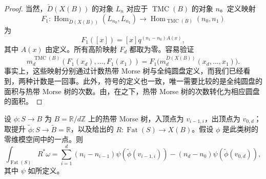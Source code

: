 \begin{proof}
当然，$\check D(X(B))$ 的对象 $L_n$ 对应于 $\operatorname{TMC}(B)$ 的对象 $n$。定义映射
\[
F_1\colon\operatorname{Hom}_{\check D(X(B))}(L_{n_0},L_{n_1})
\longrightarrow\operatorname{Hom}_{\operatorname{TMC}(B)}(n_0,n_1)
\]
为
\begin{equation}\label{eq:8.25}
F_1([x])=[x]q^{(n_1-n_0)A(x)},
\end{equation}
其中 $A(x)$ 由定义。所有高阶映射 $F_d$ 都取为零。容易验证
\[
m_d^{\operatorname{TMC}(B)}(F_1(x_d),\ldots,F_1(x_1))
=F_1\bigl(m_d^{\check D(X(B))}(x_d,\ldots,x_1)\bigr).
\]
事实上，这些映射分别通过计数热带 Morse 树与全纯圆盘定义，而我们已经看到，两种计数是一回事。此外，符号的定义也一致，唯一需要比较的是全纯圆盘的面积与热带 Morse 树的次数。由，在之下，热带 Morse 树的次数转化为相应圆盘的面积。
\end{proof}

\begin{lemma}\label{lem:8.27}
设 $\phi\colon S\to B$ 为 $B=\mathbb R/d\mathbb Z$ 上的热带 Morse 树，入顶点为 $v_{i-1,i}$，出顶点为 $v_{0,d}$；取提升 $\widetilde\phi\colon S\to\widetilde B=\mathbb R$，以及给出的 $R\colon\operatorname{Fat}(S)\to X(B)$。假设 $\phi$ 是此类树的零维模空间中的一点。则
\[
\int_{\operatorname{Fat}(S)}R^*\omega
=\sum_{i=1}^d(n_i-n_{i-1})\psi(\widetilde\phi(v_{i-1,i}))
-(n_d-n_0)\psi(\widetilde\phi(v_{0,d})),
\]
其中 $\psi$ 如所定义。
\end{lemma}


